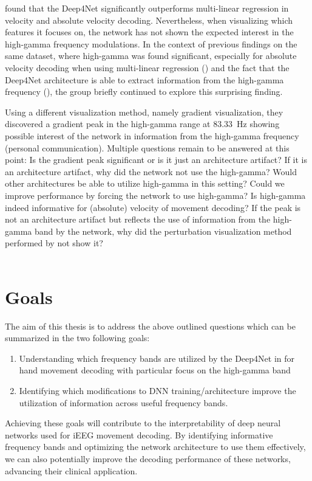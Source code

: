 \cite{Hammer-2021} found that the Deep4Net significantly outperforms multi-linear regression in velocity and absolute velocity decoding.
Nevertheless, when visualizing which features it focuses on, the network has not shown the expected interest in the high-gamma frequency modulations. 
In the context of previous findings on the same dataset, where high-gamma was found significant, especially for absolute velocity decoding when using multi-linear regression (\cite{hammer-predominance-2016}) and the fact that the Deep4Net architecture is able to extract information from the high-gamma frequency (\cite{schirrmeister-deep-2017}), the group briefly continued to explore this surprising finding.

Using a different visualization method, namely gradient visualization, they discovered a gradient peak in the high-gamma range at 83.33~Hz showing possible interest of the network in information from the high-gamma frequency (personal communication).
Multiple questions remain to be answered at this point: Is the gradient peak significant or is it just an architecture artifact?
If it is an architecture artifact, why did the network not use the high-gamma?
Would other architectures be able to utilize high-gamma in this setting?
Could we improve performance by forcing the network to use high-gamma?
Is high-gamma indeed informative for (absolute) velocity of movement decoding? 
If the peak is not an architecture artifact but reflects the use of information from the high-gamma band by the network, why did the perturbation visualization method performed by \cite{Hammer-2021} not show it?\\
\\


\section*{Goals}
The aim of this thesis is to address the above outlined questions which can be summarized in the two following goals:

\begin{enumerate}
    \item Understanding which frequency bands are utilized by the Deep4Net in \cite{Hammer-2021} for hand movement decoding with particular focus on the high-gamma band 
    \item Identifying which modifications to DNN training/architecture improve the utilization of information across useful frequency bands.
\end{enumerate}

Achieving these goals will contribute to the interpretability of deep neural networks used for iEEG movement decoding.
By identifying informative frequency bands and optimizing the network architecture to use them effectively, we can also potentially improve the decoding performance of these networks, advancing their clinical application.

